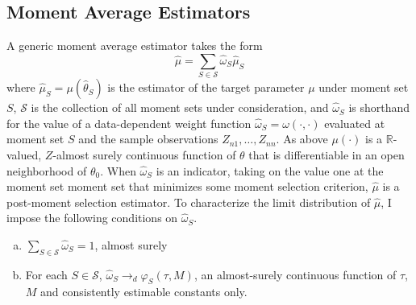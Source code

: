 \subsection{Moment Average Estimators}
A generic moment average estimator takes the form
\begin{equation}
	\label{eq:avg}
	\widehat{\mu}=\sum_{S \in \mathscr{S}} \widehat{\omega}_S\widehat{\mu}_S
\end{equation}
where $\widehat{\mu}_S = \mu(\widehat{\theta}_S)$ is the estimator of the target parameter $\mu$ under moment set $S$, $\mathscr{S}$ is the collection of all moment sets under consideration, and $\widehat{\omega}_S$ is shorthand for the value of a data-dependent weight function $\widehat{\omega}_S=\omega(\cdot, \cdot)$ evaluated at moment set $S$ and the sample observations $Z_{n1}, \hdots, Z_{nn}$.  
As above $\mu(\cdot)$ is a $\mathbb{R}$-valued, $Z$-almost surely continuous function of $\theta$ that is differentiable in an open neighborhood of $\theta_0$. 
When $\widehat{\omega}_S$ is an indicator, taking on the value one at the moment set moment set that minimizes some moment selection criterion, $\widehat{\mu}$ is a post-moment selection estimator. 
To characterize the limit distribution of $\widehat{\mu}$, I impose the following conditions on $\widehat{\omega}_S$.
\begin{assump}\mbox{}
\label{assump:weights}
\begin{enumerate}[(a)]
	\item $\sum_{S \in \mathscr{S}} \widehat{\omega}_S = 1$, almost surely 
	\item For each $S\in \mathscr{S}$, $\widehat{\omega}_S \rightarrow_d\varphi_S(\tau, M)$, an almost-surely continuous function of $\tau$, $M$ and consistently estimable constants only.
\end{enumerate}
\end{assump}

